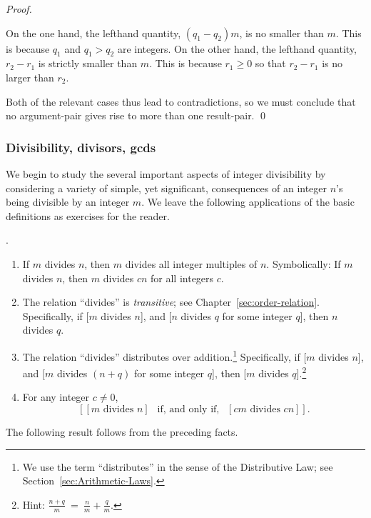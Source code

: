 \begin{proof}
\begin{itemize}
On the one hand, the lefthand quantity, $(q_1 - q_2) m$, is no smaller than $m$.  This is because $q_1$ and $q_1 > q_2$ are integers.  On the other hand, the lefthand quantity, $r_2 - r_1$ is strictly smaller than $m$.  This is because $r_1 \geq 0$ so that $r_2 - r_1$ is no larger than $r_2$.
\end{itemize}
Both of the relevant cases thus lead to contradictions, so we must conclude that no argument-pair gives rise to more than one result-pair.  \qed
\end{proof}


\subsubsection{Divisibility, divisors, {\sc gcd}s}
\label{sec:divisibility+GCD}

We begin to study the several important aspects of integer divisibility by considering a variety of simple, yet significant, consequences of an integer $n$'s being divisible by an integer $m$.  We leave the following applications of the basic definitions as exercises for the reader.

\begin{prop}.
\label{thm:basic-divisibility}
\begin{enumerate}
\item
If $m$ divides $n$, then $m$ divides all integer multiples of $n$. Symbolically: If $m$ divides $n$, then $m$ divides $cn$ for all integers $c$.
\medskip\item
The relation ``divides'' is {\em transitive}; see Chapter~\ref{sec:order-relation}.  Specifically, if [$m$ divides $n$], and [$n$ divides $q$ for some integer $q$], then $n$ divides $q$.
\medskip\item
The relation ``divides'' distributes over addition.\footnote{We use the term ``distributes'' in the sense of the Distributive Law; see Section~\ref{sec:Arithmetic-Laws}.}  Specifically, if [$m$ divides $n$], and [$m$ divides $(n+q)$ for some integer $q$], then [$m$ divides $q$].\footnote{Hint: $\displaystyle \frac{n+q}{m} \ =  \ \frac{n}{m} + \frac{q}{m}$.}
\medskip\item 
For any integer $c \neq 0$,
\[ \left[[m \mbox{ divides } n] \ \ \mbox{ if, and only if, } \ \ [cm  \mbox{ divides } cn] \right]. \]
\end{enumerate}
\end{prop}

The following result follows from the preceding facts.

